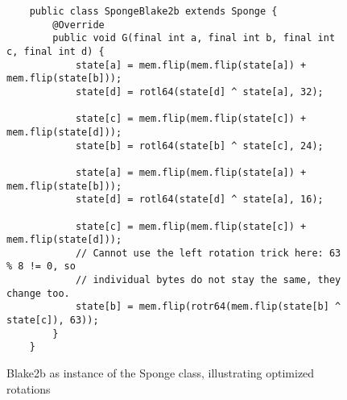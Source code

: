 \begin{figure}
\small
\begin{verbatim}
    public class SpongeBlake2b extends Sponge {
        @Override
        public void G(final int a, final int b, final int c, final int d) {
            state[a] = mem.flip(mem.flip(state[a]) + mem.flip(state[b]));
            state[d] = rotl64(state[d] ^ state[a], 32);

            state[c] = mem.flip(mem.flip(state[c]) + mem.flip(state[d]));
            state[b] = rotl64(state[b] ^ state[c], 24);

            state[a] = mem.flip(mem.flip(state[a]) + mem.flip(state[b]));
            state[d] = rotl64(state[d] ^ state[a], 16);

            state[c] = mem.flip(mem.flip(state[c]) + mem.flip(state[d]));
            // Cannot use the left rotation trick here: 63 % 8 != 0, so
            // individual bytes do not stay the same, they change too.
            state[b] = mem.flip(rotr64(mem.flip(state[b] ^ state[c]), 63));
        }
    }
\end{verbatim}
\normalsize
\caption{Blake2b as instance of the Sponge class, illustrating optimized rotations}
\label{fig:sponge-blake2b}
\end{figure}
